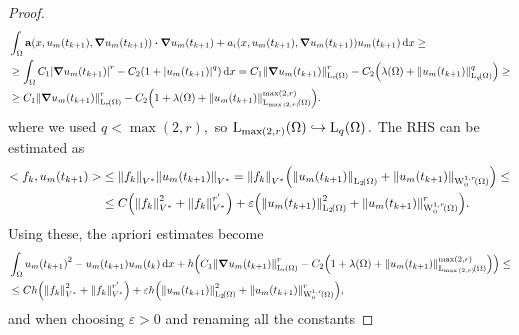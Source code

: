 \documentclass{article}
\begin{document}
\begin{proof}
	\begin{align*} 
		&\int_{\Omega}\vb{a}\qty(x, u_m\qty(t_{k+1}), \grad u_m\qty(t_{k+1}))\vdot \grad u_m\qty(t_{k+1}) + a_i\qty(x, u_m\qty(t_{k+1}), \grad u_m\qty(t_{k+1})) u_m\qty(t_{k+1})\dd{x} \geq \\
		&\geq \int_{\Omega}C_1\abs{\grad u_m\qty(t_{k+1})}^r - C_2\qty(1+\abs{u_m\qty(t_{k+1})}^q)\dd{x} = C_1 \norm{\grad u_m\qty(t_{k+1})}_{\LpSet[r]{\Omega}}^r - C_2\qty(\lambda\qty(\Omega) + \norm{u_m\qty(t_{k+1})}_{\LpSet[q]{\Omega}}^q) \geq \\
		&\geq C_1 \norm{\grad u_m\qty(t_{k+1})}_{\LpSet[r]{\Omega}}^r - C_2\qty(1+ \lambda\qty(\Omega) + \norm{u_m\qty(t_{k+1})}_{\LpSet[\max\qty(2,r)]{\Omega}}^{\max(2,r)}).
	\end{align*}
	where we used $q < \max(2,r),$ so $\LpSet[\max(2,r)]{\Omega} \hookrightarrow \LpSet[q]{\Omega}.$ The RHS can be estimated as
	\begin{align*}
		<f_{k}, u_{m}\qty(t_{k+1})> &\leq \norm{f_k}_{V^{*}}\norm{u_m\qty(t_{k+1})}_{V^{*}} = \norm{f_k}_{V^{*}}\qty(\norm{u_m\qty(t_{k+1})}_{\LpSet[2]{\Omega}} + \norm{u_m\qty(t_{k+1})}_{\WkpzeroSet[1][r]{\Omega}}) \leq \\
					    &\leq C\qty(\norm{f_k}_{V^{*}}^{2} + \norm{f_k}_{V^{*}}^{r'}) + \varepsilon \qty(\norm{u_m\qty(t_{k+1})}_{\LpSet[2]{\Omega}}^{2} + \norm{u_m\qty(t_{k+1})}_{\WkpzeroSet[1][r]{\Omega}}^r).
	\end{align*}
	Using these, the apriori estimates become
	\begin{align*}
		&\int_{\Omega} u_m\qty(t_{k+1})^{2} -u_m\qty(t_{k+1}) u_m\qty(t_k)\dd{x} + h\qty(C_1 \norm{\grad u_m\qty(t_{k+1})}_{\LpSet[r]{\Omega}}^r - C_2\qty(1+ \lambda\qty(\Omega) + \norm{u_m\qty(t_{k+1})}_{\LpSet[\max\qty(2,r)]{\Omega}}^{\max(2,r)})) \leq \\
		&\leq Ch\qty(\norm{f_k}_{V^{*}}^{2} + \norm{f_k}_{V^{*}}^{r'}) + \varepsilon h \qty(\norm{u_m\qty(t_{k+1})}_{\LpSet[2]{\Omega}}^{2} + \norm{u_m\qty(t_{k+1})}_{\WkpzeroSet[1][r]{\Omega}}^r),
	\end{align*}
	and when choosing $\varepsilon > 0$ and renaming all the constants


\end{proof}
\end{document}
